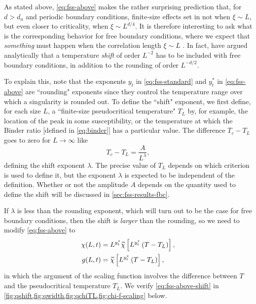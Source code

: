 As stated above, \cref{eq:fss-above} makes the rather surprising prediction
that, for $d>d_u$ and periodic boundary conditions, finite-size effects set in
not when $\xi \sim L$, but even closer to criticality, when $\xi \sim L^{d/4}$.
It is therefore interesting to ask what is the corresponding behavior for free
boundary conditions, where we expect that \emph{something} must happen when the
correlation length $\xi \sim L$ \autocite{jones2005finite}. In fact,
\textcite{rudnick1985effect} have argued analytically that a temperature
\emph{shift} of order $L^{-2}$ has to be included with free boundary
conditions, in addition to the rounding of order $L^{-d/2}$.

To explain this, note that the exponents $y_t$ in \cref{eq:fss-standard} and
$y_t^*$ in \cref{eq:fss-above} are ``rounding" exponents since they control the
temperature range over which a singularity is rounded out. To define the
``shift" exponent, we first define, for each size $L$, a ``finite-size
pseudocritical temperature" $T_L$ by, for example, the location of the peak in
some susceptibility, or the temperature at which the Binder ratio [defined in
\cref{eq:binder}] has a particular value. The difference $T_c-T_L$ goes to zero
for $L\to\infty$ like
\begin{equation}
  T_c - T_L = \frac{A}{L^{\lambda}},
  \label{eq:TL-scaling}
\end{equation}
defining the shift exponent $\lambda$. The precise value of $T_L$ depends on
which criterion is used to define it, but the exponent $\lambda$ is expected to
be independent of the definition. Whether or not the amplitude $A$ depends on
the quantity used to define the shift will be discussed in
\cref{sec:fss-results-fbc}.

If $\lambda$ is less than the rounding exponent, which will turn out to be the
case for free boundary conditions, then the shift is \emph{larger} than the
rounding, so we need to modify \cref{eq:fss-above} to
\begin{subequations}
\begin{align}
  \chi(L,t) &= L^{y_t^*} \widetilde{\chi}\left[L^{y_t^*}\left(T-T_L\right)\right],
  \label{eq:fss-above-shift-susc} \\
  g(L,t) &= \widetilde{\chi}\left[L^{y_t^*}\left(T-T_L\right)\right],
  \label{eq:fss-above-shift-binder}
\end{align}
\label{eq:fss-above-shift}
\end{subequations}
in which the argument of the scaling function involves the difference between
$T$ and the pseudocritical temperature $T_L$. We verify
\cref{eq:fss-above-shift} in
\cref{fig:qshift,fig:qwidth,fig:qchiTL,fig:chi-f-scaling} below.

